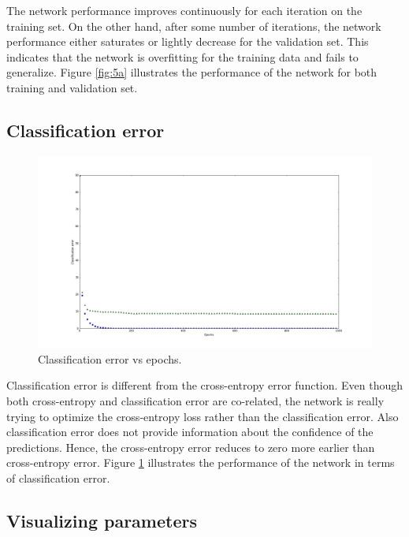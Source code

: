 \documentclass{article}
\begin{document}
The network performance improves continuously for each iteration on the training set. On the other hand, after some number of iterations, the network performance either saturates or lightly decrease for the validation set. This indicates that the network is overfitting for the training data and fails to generalize. Figure \ref{fig:5a} illustrates the performance of the network for both training and validation set.

\subsection{Classification error}

\begin{figure}[!h]
  \centering
  \includegraphics[width=\textwidth]{figures/5b}
  \caption{Classification error vs epochs.}
  \label{fig:5b}
\end{figure}

Classification error is different from the cross-entropy error function. Even though both cross-entropy and classification error are co-related, the network is really trying to optimize the cross-entropy loss rather than the classification error. Also classification error does not provide information about the confidence of the predictions. Hence, the cross-entropy error reduces to zero more earlier than cross-entropy error. Figure \ref{fig:5b} illustrates the performance of the network in terms of classification error.


\subsection{Visualizing parameters}
\end{document}
